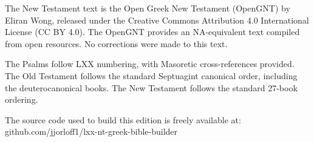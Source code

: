 \vspace{1em}
\vspace{0.5em}

\noindent The New Testament text is the Open Greek New Testament (OpenGNT) by Eliran Wong, released under
the Creative Commons Attribution 4.0 International License (CC BY 4.0). The OpenGNT provides an
NA-equivalent text compiled from open resources. No corrections were made to this text.

\vspace{1em}
\vspace{0.5em}

\noindent The Psalms follow LXX numbering, with Masoretic cross-references provided. The Old Testament
follows the standard Septuagint canonical order, including the deuterocanonical books. The New
Testament follows the standard 27-book ordering.

\vspace{1em}
\vspace{0.5em}

\noindent The source code used to build this edition is freely available at:\\
github.com/jjorloff1/lxx-nt-greek-bible-builder
